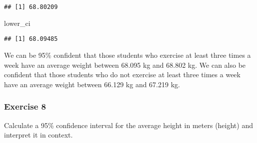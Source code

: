 \documentclass[
]{article}
\newenvironment{Shaded}{\begin{snugshade}}{\end{snugshade}}
\newcommand{\CommentTok}[1]{\textcolor[rgb]{0.56,0.35,0.01}{\textit{#1}}}
\newcommand{\DataTypeTok}[1]{\textcolor[rgb]{0.13,0.29,0.53}{#1}}
\newcommand{\KeywordTok}[1]{\textcolor[rgb]{0.13,0.29,0.53}{\textbf{#1}}}
\newcommand{\NormalTok}[1]{#1}
\newcommand{\OperatorTok}[1]{\textcolor[rgb]{0.81,0.36,0.00}{\textbf{#1}}}
\newcommand{\OtherTok}[1]{\textcolor[rgb]{0.56,0.35,0.01}{#1}}
\newcommand{\StringTok}[1]{\textcolor[rgb]{0.31,0.60,0.02}{#1}}
\begin{document}
\begin{verbatim}
## [1] 68.80209
\end{verbatim}

\begin{Shaded}
\begin{Highlighting}[]
\NormalTok{lower_ci}
\end{Highlighting}
\end{Shaded}

\begin{verbatim}
## [1] 68.09485
\end{verbatim}

We can be 95\% confident that those students who exercise at least three
times a week have an average weight between 68.095 kg and 68.802 kg. We
can also be confident that those students who do not exercise at least
three times a week have an average weight between 66.129 kg and 67.219
kg.

\hypertarget{exercise-8}{%
\subsubsection{Exercise 8}\label{exercise-8}}

Calculate a 95\% confidence interval for the average height in meters
(height) and interpret it in context.

\begin{Shaded}
\end{Shaded}
\end{document}
